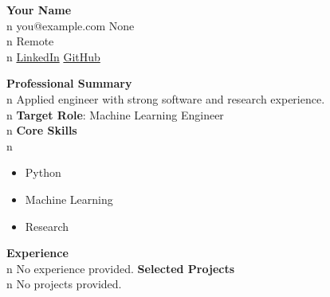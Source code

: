 \documentclass[11pt]{article}
\begin{document}
\begin{center}
{\Large \textbf{Your Name}}\\n
you@example.com None\\n
Remote\\n
\href{https://www.linkedin.com}{LinkedIn} \quad \href{https://github.com}{GitHub}
\end{center}
\vspace{0.2cm}
\noindent\textbf{Professional Summary}\\n
Applied engineer with strong software and research experience.\\n
\vspace{0.2cm}
\noindent\textbf{Target Role}: Machine Learning Engineer\\n
\vspace{0.2cm}
\noindent\textbf{Core Skills}\\n
\begin{itemize}[leftmargin=*]
\item {Python}
\item {Machine Learning}
\item {Research}
\end{itemize}
\vspace{0.2cm}
\noindent\textbf{Experience}\\n
No experience provided.
\vspace{0.2cm}
\noindent\textbf{Selected Projects}\\n
No projects provided.
\end{document}
